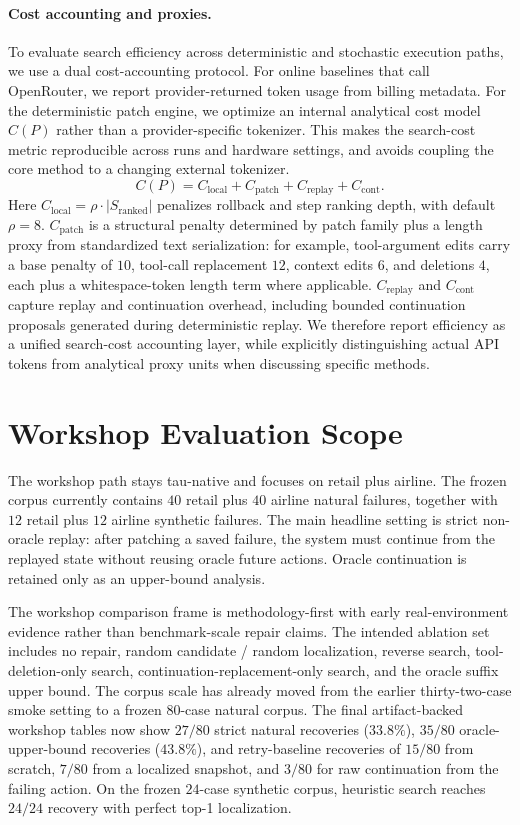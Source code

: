 \documentclass{article}
\begin{document}
\paragraph{Cost accounting and proxies.}
To evaluate search efficiency across deterministic and stochastic execution
paths, we use a dual cost-accounting protocol. For online baselines that call
OpenRouter, we report provider-returned token usage from billing metadata. For
the deterministic patch engine, we optimize an internal analytical cost model
$C(P)$ rather than a provider-specific tokenizer. This makes the search-cost
metric reproducible across runs and hardware settings, and avoids coupling the
core method to a changing external tokenizer.
\begin{equation}
C(P) = C_{\text{local}} + C_{\text{patch}} + C_{\text{replay}} + C_{\text{cont}} .
\end{equation}
Here $C_{\text{local}} = \rho \cdot \left|S_{\text{ranked}}\right|$ penalizes rollback and
step ranking depth, with default $\rho = 8$. $C_{\text{patch}}$ is a structural
penalty determined by patch family plus a length proxy from standardized text
serialization: for example, tool-argument edits carry a base penalty of $10$,
tool-call replacement $12$, context edits $6$, and deletions $4$, each plus a
whitespace-token length term where applicable. $C_{\text{replay}}$ and
$C_{\text{cont}}$ capture replay and continuation overhead, including bounded
continuation proposals generated during deterministic replay. We therefore
report efficiency as a unified search-cost accounting layer, while explicitly
distinguishing actual API tokens from analytical proxy units when discussing
specific methods.

\section{Workshop Evaluation Scope}

The workshop path stays tau-native and focuses on retail plus airline. The
frozen corpus currently contains $40$ retail plus $40$ airline natural
failures, together with $12$ retail plus $12$ airline synthetic failures. The
main headline setting is strict non-oracle replay: after patching a saved
failure, the system must continue from the replayed state without reusing
oracle future actions. Oracle continuation is retained only as an upper-bound
analysis.

The workshop comparison frame is methodology-first with early real-environment
evidence rather than benchmark-scale repair claims. The intended ablation set
includes no repair, random candidate / random localization, reverse search,
tool-deletion-only search, continuation-replacement-only search, and the
oracle suffix upper bound. The corpus scale has already moved from the earlier
thirty-two-case smoke setting to a frozen $80$-case natural corpus. The final
artifact-backed workshop tables now show $27/80$ strict natural recoveries
($33.8\%$), $35/80$ oracle-upper-bound recoveries ($43.8\%$), and retry-baseline
recoveries of $15/80$ from scratch, $7/80$ from a localized snapshot, and
$3/80$ for raw continuation from the failing action. On the frozen $24$-case
synthetic corpus, heuristic search reaches $24/24$ recovery with perfect
top-1 localization.
\end{document}
